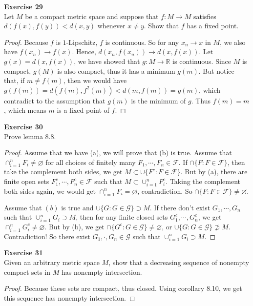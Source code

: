 \documentclass[12pt, a4paper]{article}
\theoremstyle{plain}
\newcommand{\R}{\mathbb{R}}
\newcommand{\F}{\mathcal{F}}
\newcommand{\G}{\mathcal{G}}
\newenvironment{exercise}[2][Exercise]
    { \begin{mdframed}[backgroundcolor=gray!20] \textbf{#1 #2} \\}
    {  \end{mdframed}}
\begin{document}
\begin{exercise}{29}
Let $M$ be a compact metric space and suppose that $f:M\rightarrow M$ satisfies $d(f(x),f(y))<d(x,y)$ whenever $x\neq y$. Show that $f$ has a fixed point.
\end{exercise}
	\begin{proof}
	Because $f$ is $1$-Lipschitz, $f$ is continuous. So for any $x_n\rightarrow x$ in $M$, we also have $f(x_n)\rightarrow f(x)$. Hence, $d(x_n,f(x_n))\rightarrow d(x,f(x))$. Let $g(x)=d(x,f(x))$, we have showed that $g:M\rightarrow \R$ is continuous. Since $M$ is compact, $g(M)$ is also compact, thus it has a minimum $g(m)$. But notice that, if $m\neq f(m)$, then we would have $g(f(m))=d(f(m),f^2(m))<d(m,f(m))=g(m)$, which contradict to the assumption that $g(m)$ is the minimum of $g$. Thus $f(m)=m$, which means $m$ is a fixed point of $f$.
	\end{proof}
	
\begin{exercise}{30}
Prove lemma 8.8.
\end{exercise}
	\begin{proof}
	Assume that we have (a), we will prove that (b) is true. Assume that $\cap_{i=1}^n F_i\neq \varnothing$ for all choices of finitely many $F_1,\cdots ,F_n\in \F$. If $\cap\{F:F\in\F\}$, then take the complement both sides, we get $M\subset \cup\{F^c:F\in\F\}$. But by (a), there are finite open sets $F_1^c,\cdots,F_n^c\in \F$ such that $M\subset \cup_{i=1}^n F_i^c$. Taking the complement both sides again, we would get $\cap_{i=1}^n F_i=\varnothing$, contradiction. So $\cap\{F:F\in\F\}\neq \varnothing$.
	
	Assume that $(b)$ is true and $\cup\{ G:G\in\G\}\supset M$. If there don't exist $G_1,\cdots,G_n$ such that $\cup_{i=1}^{n} G_i\supset M$, then for any finite closed sets $G_1^c,\cdots,G_n^c$, we get $\cap_{i=1}^nG_i^c\neq \varnothing$. But by (b), we get $\cap\{G^c:G\in\G\}\neq \varnothing$, or $\cup\{G:G\in\G\}\not\supset M$. Contradiction! So there exist $G_1,\cdot,G_n\in\G$ such that $\cup_{i=1}^n G_i\supset M$.
	\end{proof}
	
\begin{exercise}{31}
Given an arbitrary metric space $M$, show that a decreasing sequence of nonempty compact sets in $M$ has nonempty intersection.
\end{exercise}
	\begin{proof}
	Because these sets are compact, thus closed. Using corollary 8.10, we get this sequence has nonempty intersection.
	\end{proof}
	
\end{document}
